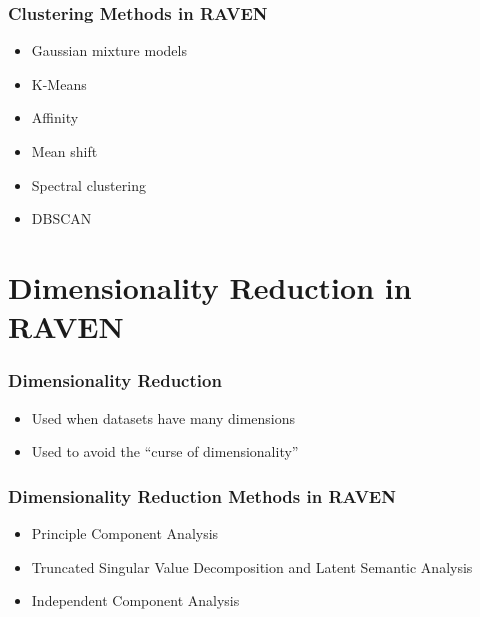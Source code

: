 \documentclass[t,9pt,svgnames]{beamer}
\begin{document}
\begin{frame}
  \frametitle{Clustering Methods in RAVEN}
  \begin{itemize}
  \item Gaussian mixture models
  \item K-Means
  \item Affinity
  \item Mean shift
  \item Spectral clustering
  \item DBSCAN
  \end{itemize}
\end{frame}

\section{Dimensionality Reduction in RAVEN}

\begin{frame}
  \frametitle{Dimensionality Reduction}
  \begin{itemize}
  \item Used when datasets have many dimensions
  \item Used to avoid the ``curse of dimensionality''
  \end{itemize}
\end{frame}

\begin{frame}
  \frametitle{Dimensionality Reduction Methods in RAVEN}
  \begin{itemize}
  \item Principle Component Analysis
  \item Truncated Singular Value Decomposition and Latent Semantic Analysis
  \item Independent Component Analysis
  \end{itemize}
\end{frame}

\end{document}
